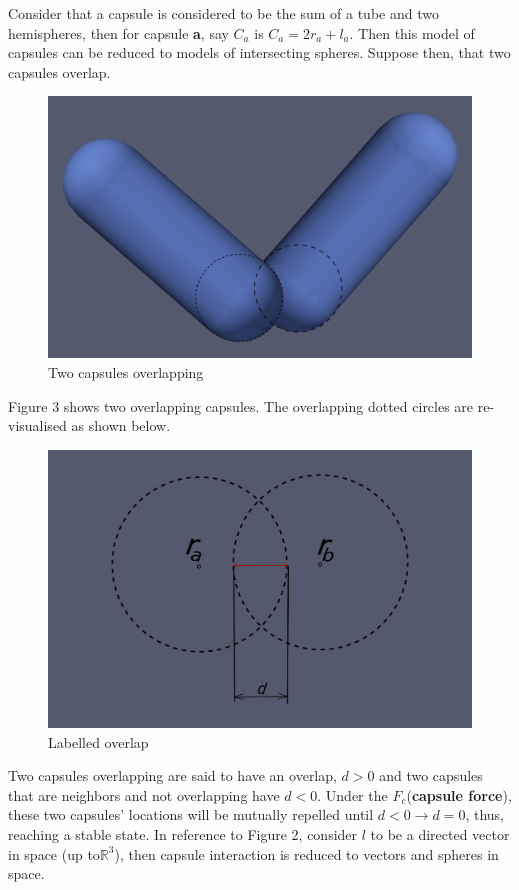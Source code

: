 \documentclass[journal, a4paper]{IEEEtran}
\begin{document}
	Consider that a capsule is considered to be the sum of a tube and two hemispheres, then for capsule \textbf{a}, say $C_a$ is $C_a=2r_a+l_a$. Then this model of capsules can be reduced to models of intersecting spheres. Suppose then, that two capsules overlap.
	\begin{figure}[H]
	    \centering
	    \includegraphics[scale = 0.22]{OverlappingCapsules.png}
	    \caption{Two capsules overlapping}
	    \label{fig:overlapping_capsules}
	\end{figure}
	Figure 3 shows two overlapping capsules. The overlapping dotted circles are re-visualised as shown below.
	\begin{figure}[H]
	    \centering
	    \includegraphics[scale = 0.52]{SkeletonOverlap.png}
	    \caption{Labelled overlap}
	    \label{fig:skeleton_overlap}
	\end{figure}	
    Two capsules overlapping are said to have an overlap, $d>0$ and two capsules that are neighbors and not overlapping have $d<0$. Under the $F_c$(\textbf{capsule force}), these two capsules' locations will be mutually repelled until $d<0\rightarrow d = 0$, thus, reaching a stable state. In reference to Figure 2, consider $l$ to be a directed vector in space (up to$\mathbb{R}^3$), then capsule interaction is reduced to vectors and spheres in space. 
\end{document}
